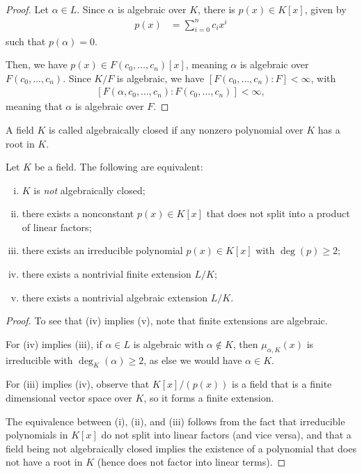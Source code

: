 \documentclass[10pt]{mypackage}
\begin{document}
\begin{proof}
  Let $\alpha\in L$. Since $\alpha$ is algebraic over $K$, there is $p(x)\in K[x]$, given by
  \begin{align*}
    p(x) &= \sum_{i=0}^{n}c_ix^i
  \end{align*}
  such that $p\left( \alpha \right) = 0$.

  Then, we have $p(x)\in F\left( c_0,\dots,c_n \right)[x]$, meaning $\alpha$ is algebraic over $F\left( c_0,\dots,c_n \right)$. Since $K/F$ is algebraic, we have $\left[ F\left( c_0,\dots,c_n \right):F \right] < \infty$, with
  \begin{align*}
    \left[ F\left( \alpha,c_0,\dots,c_n \right):F\left( c_0,\dots,c_n \right) \right] < \infty,
  \end{align*}
  meaning that $\alpha$ is algebraic over $F$.
\end{proof}
\begin{definition}
  A field $K$ is called algebraically closed if any nonzero polynomial over $K$ has a root in $K$.
\end{definition}
\begin{lemma}
  Let $K$ be a field. The following are equivalent:
  \begin{enumerate}[(i)]
    \item $K$ is \textit{not} algebraically closed;
    \item there exists a nonconstant $p(x)\in K[x]$ that does not split into a product of linear factors;
    \item there exists an irreducible polynomial $p(x)\in K[x]$ with $\deg(p)\geq 2$;
    \item there exists a nontrivial finite extension $L/K$;
    \item there exists a nontrivial algebraic extension $L/K$.
  \end{enumerate}
\end{lemma}
\begin{proof}
  To see that (iv) implies (v), note that finite extensions are algebraic.

  For (iv) implies (iii), if $\alpha\in L$ is algebraic with $\alpha\notin K$, then $\mu_{\alpha,K}(x)$ is irreducible with $\deg_K\left( \alpha \right) \geq 2$, as else we would have $\alpha\in K$.

  For (iii) implies (iv), observe that $K[x]/\left( p(x) \right)$ is a field that is a finite dimensional vector space over $K$, so it forms a finite extension.

  The equivalence between (i), (ii), and (iii) follows from the fact that irreducible polynomials in $K[x]$ do not split into linear factors (and vice versa), and that a field being not algebraically closed implies the existence of a polynomial that does not have a root in $K$ (hence does not factor into linear terms).
\end{proof}
\end{document}
